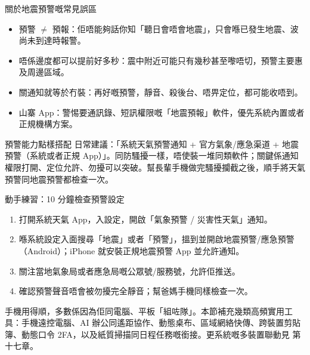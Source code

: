 \begin{tcbwarn}{關於地震預警嘅常見誤區}
\begin{itemize}
  \item 預警 $\neq$ 預報：佢唔能夠話你知「聽日會唔會地震」，只會喺已發生地震、波尚未到達時報警。
  \item 唔係邊度都可以提前好多秒：震中附近可能只有幾秒甚至嚟唔切，預警主要惠及周邊區域。
  \item 關通知就等於冇裝：再好嘅預警，靜音、殺後台、唔畀定位，都可能收唔到。
  \item 山寨 App：警惕要通訊錄、短訊權限嘅「地震預報」軟件，優先系統內置或者正規機構方案。
\end{itemize}

\end{tcbwarn}

\begin{tcbinfo}{預警能力點樣搭配}
日常建議：「系統天氣預警通知 + 官方氣象/應急渠道 + 地震預警（系統或者正規 App）」。同防騷擾一樣，唔使裝一堆同類軟件；關鍵係通知權限打開、定位允許、勿擾可以突破。幫長輩手機做完騷擾攔截之後，順手將天氣預警同地震預警都檢查一次。

\end{tcbinfo}

\begin{tcbpractice}{動手練習：10 分鐘檢查預警設定}
\begin{enumerate}
  \item 打開系統天氣 App，入設定，開啟「氣象預警 / 災害性天氣」通知。
  \item 喺系統設定入面搜尋「地震」或者「預警」，搵到並開啟地震預警/應急預警（Android）；iPhone 就安裝正規地震預警 App 並允許通知。
  \item 關注當地氣象局或者應急局嘅公眾號/服務號，允許佢推送。
  \item 確認預警聲音唔會被勿擾完全靜音；幫爸媽手機同樣檢查一次。
\end{enumerate}

\end{tcbpractice}


手機用得順，多數係因為佢同電腦、平板「組咗隊」。本節補充幾類高頻實用工具：手機遠控電腦、AI 辦公同遙距協作、動態桌布、區域網絡快傳、跨裝置剪貼簿、動態口令 2FA，以及紙質掃描同日程任務嘅銜接。更系統嘅多裝置聯動見 第十七章。


